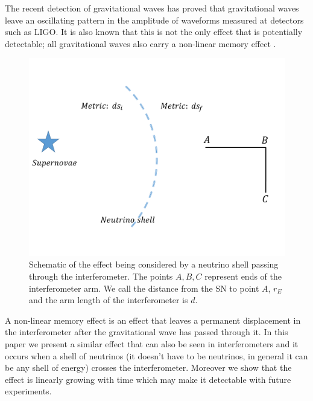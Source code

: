 \documentclass[aps,showpacs,twocolumn,floats,prd,superscriptaddress,nofootinbib]{revtex4-1}
\begin{document}
The recent detection of gravitational waves \cite{GW1509} has proved that gravitational waves leave an oscillating pattern in the amplitude of waveforms measured at detectors such as LIGO. It is also known that this is not the only effect that is potentially detectable; all gravitational waves also carry a non-linear memory effect \cite{Christodoulou_effect}. 

\begin{figure}[h!]
\begin{center}
\includegraphics[scale = 0.3]{intro.pdf}
\caption{Schematic of the effect being considered by a neutrino shell passing through the interferometer. The points $A,B,C$ represent ends of the interferometer arm. We call the distance from the SN to point $A$, $r_E$ and the arm length of the interferometer is $d$.}
\label{fig:1}
\end{center}
\end{figure}

A non-linear memory effect is an effect that leaves a permanent displacement in the interferometer after the gravitational wave has passed through it. In this paper we present a similar effect that can also be seen in interferometers and it occurs when a shell of neutrinos (it doesn't have to be neutrinos, in general it can be any shell of energy) crosses the interferometer. Moreover we show that the effect is linearly growing with time which may make it detectable with future experiments.
\end{document}
